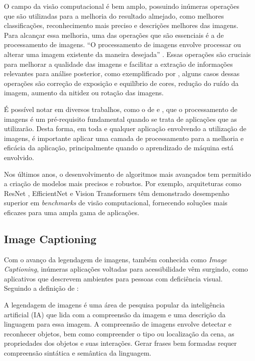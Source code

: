 O campo da visão computacional é bem amplo, possuindo inúmeras operações que são utilizadas para a melhoria do resultado almejado, como melhores classificações, reconhecimento mais preciso e descrições melhores das imagens. Para alcançar essa melhoria, uma das operações que são essenciais é a de processamento de imagens. “O processamento de imagens envolve processar ou alterar uma imagem existente da maneira desejada” \cite{Phillips1994}. Essas operações são cruciais para melhorar a qualidade das imagens e facilitar a extração de informações relevantes para análise posterior, como exemplificado por , alguns casos dessas operações são correção de exposição e equilíbrio de cores, redução do ruído da imagem, aumento da nitidez ou rotação das imagens. 

É possível notar em diversos trabalhos, como o de  e , que o processamento de imagens é um pré-requisito fundamental quando se trata de aplicações que as utilizarão. Desta forma, em toda e qualquer aplicação envolvendo a utilização de imagens, é importante aplicar uma camada de processamento para a melhoria e eficácia da aplicação, principalmente quando o aprendizado de máquina está envolvido.

Nos últimos anos, o desenvolvimento de algoritmos mais avançados tem permitido a criação de modelos mais precisos e robustos. Por exemplo, arquiteturas como ResNet \cite{He2015}, EfficientNet \cite{tan2019} e Vision Transformers \cite{dosovitskiy2020} têm demonstrado desempenho superior em \textit{benchmarks} de visão computacional, fornecendo soluções mais eficazes para uma ampla gama de aplicações.

\subsection{Image Captioning}

Com o avanço da legendagem de imagens, também conhecida como \textit{Image Captioning}, inúmeras aplicações voltadas para acessibilidade vêm surgindo, como aplicativos que descrevem ambientes para pessoas com deficiência visual. Seguindo a definição de :

\begin{citacao}
    A legendagem de imagens é uma área de pesquisa popular da inteligência artificial (IA) que lida com a compreensão da imagem e uma descrição da linguagem para essa imagem. A compreensão de imagens envolve detectar e reconhecer objetos, bem como compreender o tipo ou localização da cena, as propriedades dos objetos e suas interações. Gerar frases bem formadas requer compreensão sintática e semântica da linguagem.
\end{citacao}

